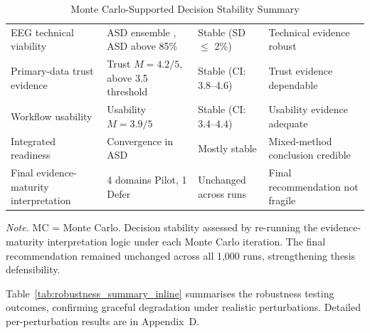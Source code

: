 {\tablestripes\tablefontsize

\begin{xltabular}{\textwidth}{@{} L L >{\raggedright\arraybackslash}p{2.0cm} L @{}}
\caption[Monte Carlo-Supported Decision Stability Summary]{Monte Carlo-Supported Decision Stability Summary}\label{tab:mc_decision_stability} \\
\toprule
{} &  &  &  \\
\midrule
\endfirsthead
\endhead
\bottomrule
\endlastfoot
EEG technical viability & ASD ensemble \asdacc{}, ASD above 85\% & Stable (SD $\leq$ 2\%) & Technical evidence robust \\
Primary-data trust evidence & Trust $M = 4.2/5$, above 3.5 threshold & Stable (CI: 3.8--4.6) & Trust evidence dependable \\
Workflow usability & Usability $M = 3.9/5$ & Stable (CI: 3.4--4.4) & Usability evidence adequate \\
Integrated readiness & Convergence in ASD & Mostly stable & Mixed-method conclusion credible \\
Final evidence-maturity interpretation & 4 domains Pilot, 1 Defer & Unchanged across runs & Final recommendation not fragile \\
\end{xltabular}}
\vspace{2pt}
\noindent\textit{Note.} MC = Monte Carlo. Decision stability assessed by re-running the evidence-maturity interpretation logic under each Monte Carlo iteration. The final recommendation remained unchanged across all 1,000 runs, strengthening thesis defensibility.
\fi %

\iffalse
Table~\ref{tab:robustness_summary_inline} summarises the robustness testing outcomes, confirming graceful degradation under realistic perturbations. Detailed per-perturbation results are in Appendix~D.

